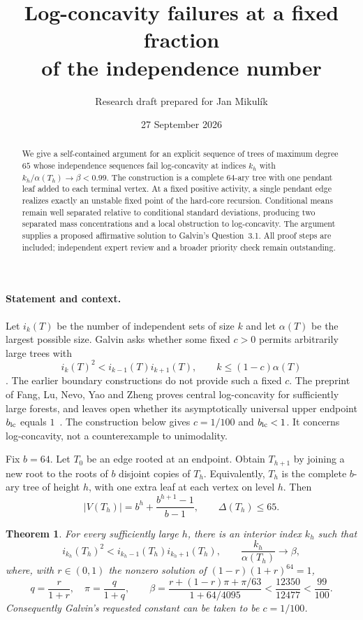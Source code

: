 \documentclass[11pt]{article}
\title{Log-concavity failures at a fixed fraction\\of the independence number}
\author{Research draft prepared for Jan Mikul\'ik}
\date{27 September 2026}
\newtheorem{theorem}{Theorem}
\begin{document}
\maketitle
\begin{abstract}
We give a self-contained argument for an explicit sequence of trees of maximum degree $65$ whose independence sequences fail log-concavity at indices $k_h$ with $k_h/\alpha(T_h)\to\beta<0.99$. The construction is a complete $64$-ary tree with one pendant leaf added to each terminal vertex. At a fixed positive activity, a single pendant edge realizes exactly an unstable fixed point of the hard-core recursion. Conditional means remain well separated relative to conditional standard deviations, producing two separated mass concentrations and a local obstruction to log-concavity. The argument supplies a proposed affirmative solution to Galvin's Question~3.1. All proof steps are included; independent expert review and a broader priority check remain outstanding.
\end{abstract}

\paragraph{Statement and context.}
Let $i_k(T)$ be the number of independent sets of size $k$ and let $\alpha(T)$ be the largest possible size. Galvin asks whether some fixed $c>0$ permits arbitrarily large trees with
\[
 i_k(T)^2<i_{k-1}(T)i_{k+1}(T),\qquad k\le(1-c)\alpha(T)
\]
\cite[Question 3.1]{Galvin}. The earlier boundary constructions do not provide such a fixed $c$. The preprint of Fang, Lu, Nevo, Yao and Zheng proves central log-concavity for sufficiently large forests, and leaves open whether its asymptotically universal upper endpoint $b_{\rm lc}$ equals $1$~\cite[Section 9]{Fang}. The construction below gives $c=1/100$ and $b_{\rm lc}<1$. It concerns log-concavity, not a counterexample to unimodality.

Fix $b=64$. Let $T_0$ be an edge rooted at an endpoint. Obtain $T_{h+1}$ by joining a new root to the roots of $b$ disjoint copies of $T_h$. Equivalently, $T_h$ is the complete $b$-ary tree of height $h$, with one extra leaf at each vertex on level $h$. Then
\[
 |V(T_h)|=b^h+\frac{b^{h+1}-1}{b-1},\qquad \Delta(T_h)\le65.
\]
\begin{theorem}\label{thm:main}
For every sufficiently large $h$, there is an interior index $k_h$ such that
\[
 i_{k_h}(T_h)^2<i_{k_h-1}(T_h)i_{k_h+1}(T_h),\qquad
 \frac{k_h}{\alpha(T_h)}\longrightarrow\beta,
\]
where, with $r\in(0,1)$ the nonzero solution of $(1-r)(1+r)^{64}=1$,
\begin{equation}\label{eq:beta}
 q=\frac r{1+r},\quad \pi=\frac q{1+q},\qquad
 \beta=\frac{r+(1-r)\pi+\pi/63}{1+64/4095}
 <\frac{12350}{12477}<\frac{99}{100}.
\end{equation}
Consequently Galvin's requested constant can be taken to be $c=1/100$.
\end{theorem}
\end{document}
